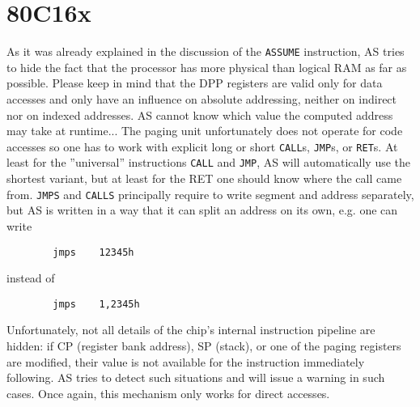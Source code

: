 \documentclass[12pt,twoside]{report}
\newcommand{\tty}[1]{{\tt #1}}
\begin{document}

\section{80C16x}

As it was already explained in the discussion of the \tty{ASSUME}
instruction, AS tries to hide the fact that the processor has more
physical than logical RAM as far as possible.  Please keep in mind
that the DPP registers are valid only for data accesses and only
have an influence on absolute addressing, neither on indirect nor on indexed
addresses.  AS cannot know which value the computed address may take
at runtime...
The paging unit unfortunately does not operate for code accesses so
one has to work with explicit long or short \tty{CALL}s, \tty{JMP}s, or
\tty{RET}s.  At least for the ''universal'' instructions \tty{CALL} and
\tty{JMP}, AS will automatically use the shortest variant, but at least for the RET one
should know where the call came from.  \tty{JMPS} and \tty{CALLS} principally
require to write segment and address separately, but AS is written in
a way that it can split an address on its own, e.g. one can write
\begin{verbatim}
        jmps    12345h
\end{verbatim}
instead of
\begin{verbatim}
        jmps    1,2345h
\end{verbatim}
Unfortunately, not all details of the chip's internal instruction
pipeline are hidden: if CP (register bank address), SP (stack), or
one of the paging registers are modified, their value is not
available for the instruction immediately following.  AS tries to
detect such situations and will issue a warning in such cases.  Once
again, this mechanism only works for direct accesses.
\end{document}
